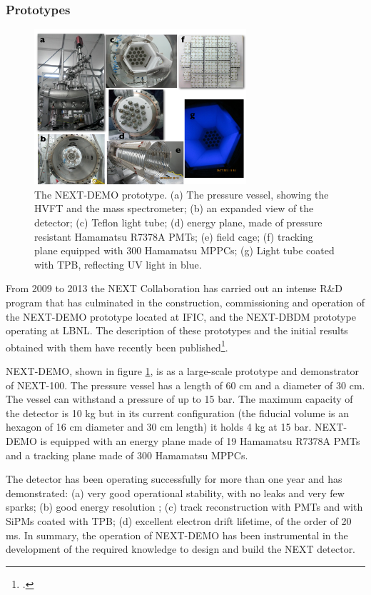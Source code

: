 \subsubsection*{Prototypes}

\begin{figure}
\centering
\includegraphics[width=0.7\textwidth]{img/DEMO.pdf}
\caption{\small The NEXT-DEMO prototype. (a) The pressure vessel, showing the HVFT and the mass spectrometer; (b) an expanded view of the detector; (c) Teflon light tube; (d) energy plane, made of pressure resistant Hamamatsu R7378A PMTs; (e) field cage; (f) tracking plane equipped with 300 Hamamatsu MPPCs; (g) Light tube coated with TPB, reflecting UV light in blue.} \label{fig.DEMO}
\end{figure}

From 2009 to 2013 the NEXT Collaboration has carried out an intense R\&D program that has culminated in the construction, commissioning and operation of the NEXT-DEMO prototype located at IFIC, and the NEXT-DBDM prototype operating at LBNL. The description of these prototypes and the initial results obtained with them have recently been published\footcite{Alvarez:2012hh, Alvarez:2012nd, Alvarez:2012hu}.

NEXT-DEMO, shown in figure \ref{fig.DEMO}, is as a large-scale prototype and demonstrator of NEXT-100. The pressure vessel has a length of 60 cm and a diameter of 30 cm. The vessel can withstand a pressure of up to 15 bar. The maximum capacity of the detector is 10 kg but in its current configuration (the fiducial volume is an hexagon of 16 cm diameter and 30 cm length) it holds 4 kg at 15 bar. NEXT-DEMO is  equipped with an energy plane made of 19 Hamamatsu R7378A PMTs and a tracking plane made of 300 Hamamatsu MPPCs. 

The detector has been operating successfully for more than one year and has demonstrated: (a) very good operational stability, with no leaks and very few sparks; (b) good energy resolution ; (c) track reconstruction with PMTs and with SiPMs coated with TPB; (d) excellent electron drift lifetime, of the order of 20 ms. In summary, the operation of NEXT-DEMO has been instrumental in the development of the required knowledge to design and build the NEXT detector.

